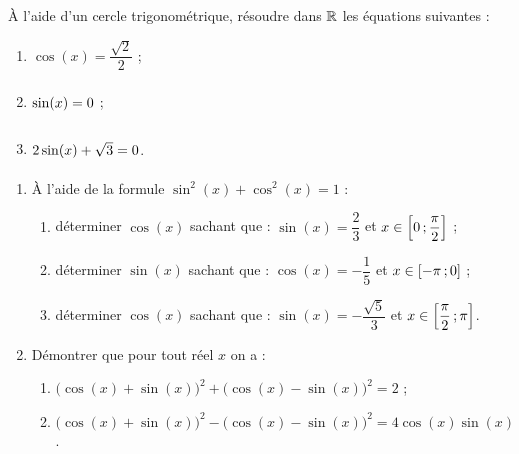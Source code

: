 \documentclass[a4paper,11pt]{article}
\begin{document}
\medskip


\medskip

À l’aide d’un cercle trigonométrique, résoudre dans $\R$ les équations suivantes :
\begin{multicols}{3}
	\begin{enumerate}
		\item $\cos(x)=\dfrac{\sqrt{2}}{2}$ ;
		\item $\sin(x)=0\vphantom{\dfrac{\sqrt{2}}{2}}$ ;
		\item $2\sin(x)+\sqrt{3}=0\vphantom{\dfrac{\sqrt{2}}{2}}$.
	\end{enumerate}
\end{multicols}

\medskip


\begin{enumerate}
	\item À l’aide de la formule $\sin^2(x) +\cos^2(x) =1$ :
	\begin{enumerate}
		\item déterminer $\cos(x)$ sachant que : $\sin(x)=\dfrac23$ et $x \in \mbox{\ensuremath{\left[0\mathpunct{};\dfrac{\pi}{2}\right]}}$ ;
		\item déterminer $\sin(x)$ sachant que : $\cos(x)=-\dfrac15$ et $x \in \mbox{\ensuremath{\left[-\pi\mathpunct{};0\right]}}$ ;
		\item déterminer $\cos(x)$ sachant que : $\sin(x)=-\dfrac{\sqrt{5}}{3}$ et $x \in \mbox{\ensuremath{\left[\dfrac{\pi}{2}\mathpunct{};\pi\right]}}$.
	\end{enumerate}
	\item Démontrer que pour tout réel $x$ on a :
	\begin{enumerate}
		\item $\big(\cos(x) + \sin(x)\big)^2 + \big(\cos(x) - \sin(x)\big)^2 = 2$ ;
		\item $\big(\cos(x) + \sin(x)\big)^2 - \big(\cos(x) - \sin(x)\big)^2 = 4\cos(x)\sin(x)$.
	\end{enumerate}
\end{enumerate}
\end{document}
